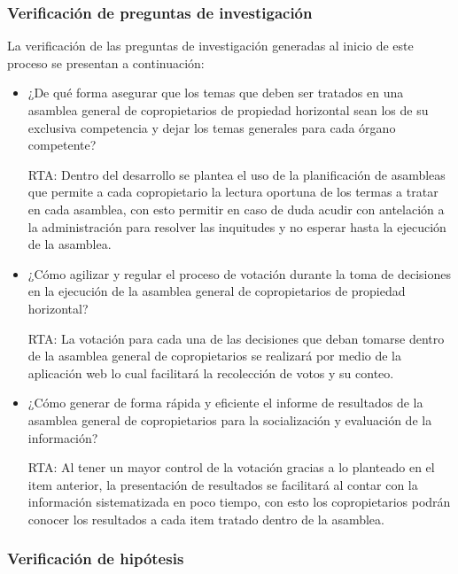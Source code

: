 \subsubsection{Verificación de preguntas de investigación}

La verificación de las preguntas de investigación generadas al inicio de este proceso se presentan a continuación:

\begin{itemize}
	\item ¿De qué forma asegurar que los temas que deben ser tratados en una asamblea general de copropietarios de propiedad horizontal sean los de su exclusiva competencia y dejar los temas generales para cada órgano competente?
	
	\item[RTA:] Dentro del desarrollo se plantea el uso de la planificación de asambleas que permite a cada copropietario la lectura oportuna de los termas a tratar en cada asamblea, con esto permitir en caso de duda acudir con antelación a la administración para resolver las inquitudes y no esperar hasta la ejecución de la asamblea.
	
	\item ¿Cómo agilizar y regular el proceso de votación durante la toma de decisiones en la ejecución de la asamblea general de copropietarios de propiedad horizontal?
	
	\item[RTA:] La votación para cada una de las decisiones que deban tomarse dentro de la asamblea general de copropietarios se realizará por medio de la aplicación web lo cual facilitará la recolección de votos y su conteo.
	
	\item ¿Cómo generar de forma rápida y eficiente el informe de resultados de la asamblea general de copropietarios para la socialización y evaluación de la información?
	
	\item[RTA:] Al tener un mayor control de la votación gracias a lo planteado en el item anterior, la presentación de resultados se facilitará al contar con la información sistematizada en poco tiempo, con esto los copropietarios podrán conocer los resultados a cada item tratado dentro de la asamblea.
	
\end{itemize}

\subsubsection{Verificación de hipótesis}


